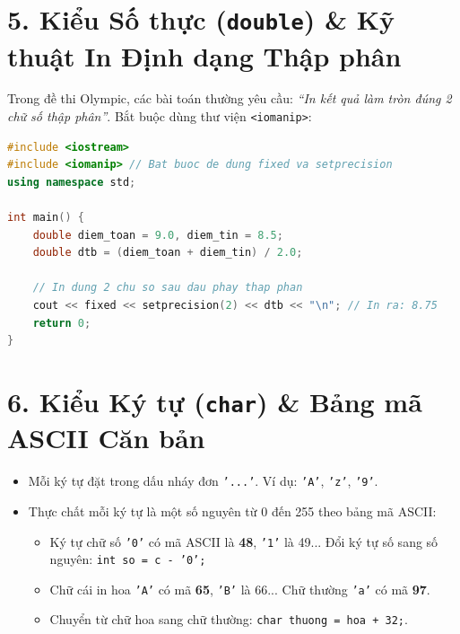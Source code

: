 \documentclass[11pt,a4paper]{article}
\begin{document}
\vspace{-2mm}
\section*{\color{AsianDarkBlue}\normalsize 5. Kiểu Số thực (\texttt{double}) \& Kỹ thuật In Định dạng Thập phân}
Trong đề thi Olympic, các bài toán thường yêu cầu: \textit{``In kết quả làm tròn đúng 2 chữ số thập phân''}. Bắt buộc dùng thư viện \texttt{<iomanip>}:

\begin{lstlisting}[language=C++]
#include <iostream>
#include <iomanip> // Bat buoc de dung fixed va setprecision
using namespace std;

int main() {
    double diem_toan = 9.0, diem_tin = 8.5;
    double dtb = (diem_toan + diem_tin) / 2.0;

    // In dung 2 chu so sau dau phay thap phan
    cout << fixed << setprecision(2) << dtb << "\n"; // In ra: 8.75
    return 0;
}
\end{lstlisting}

\vspace{-2mm}
\section*{\color{AsianDarkBlue}\normalsize 6. Kiểu Ký tự (\texttt{char}) \& Bảng mã ASCII Căn bản}
\begin{itemize}
    \setlength{\itemsep}{0.5pt}
    \small
    \item Mỗi ký tự đặt trong dấu nháy đơn \texttt{'...'}. Ví dụ: \texttt{'A'}, \texttt{'z'}, \texttt{'9'}.
    \item Thực chất mỗi ký tự là một số nguyên từ 0 đến 255 theo bảng mã ASCII:
    \begin{itemize}
        \item Ký tự chữ số \texttt{'0'} có mã ASCII là \textbf{48}, \texttt{'1'} là 49... Đổi ký tự số sang số nguyên: \texttt{int so = c - '0';}
        \item Chữ cái in hoa \texttt{'A'} có mã \textbf{65}, \texttt{'B'} là 66... Chữ thường \texttt{'a'} có mã \textbf{97}.
        \item Chuyển từ chữ hoa sang chữ thường: \texttt{char thuong = hoa + 32;}.
    \end{itemize}
\end{itemize}

\vspace{-2mm}
\end{document}
